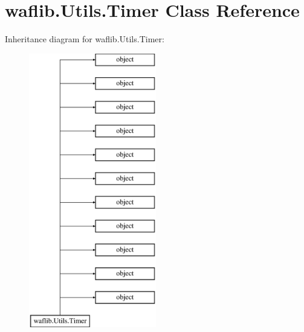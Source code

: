 \hypertarget{classwaflib_1_1_utils_1_1_timer}{}\section{waflib.\+Utils.\+Timer Class Reference}
\label{classwaflib_1_1_utils_1_1_timer}
Inheritance diagram for waflib.\+Utils.\+Timer\+:\begin{figure}[H]
\begin{center}
\leavevmode
\includegraphics[height=12.000000cm]{classwaflib_1_1_utils_1_1_timer}
\end{center}
\end{figure}
